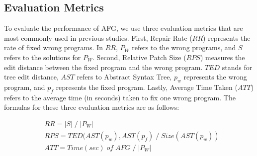 \documentclass[10pt,conference]{IEEEtran}
\begin{document}
    \subsection{Evaluation Metrics}
        To evaluate the performance of AFG, we use three evaluation metrics that are most commonly used in previous studies. First, Repair Rate ($RR$) represents the rate of fixed wrong programs. In $RR$, $P_{W}$ refers to the wrong programs, and $S$ refers to the solutions for $P_{W}$. Second, Relative Patch Size ($RPS$) measures the edit distance between the fixed program and the wrong program. $TED$ stands for tree edit distance, $AST$ refers to Abstract Syntax Tree, $p_{w}$ represents the wrong program, and $p_{f}$ represents the fixed program. Lastly, Average Time Taken ($ATT$) refers to the average time (in seconds) taken to fix one wrong program. The formulas for these three evaluation metrics are as follows:

        \begin{align}
            &RR = |S|\;/\;|P_{W}| \nonumber \\
            &RPS = TED(AST(p_{w}),AST(p_{f})\;/\;Size(AST(p_{w})) \nonumber \\
            &ATT = Time(sec)\;of\;AFG\;/\;|P_{W}| \nonumber
        \end{align}
\end{document}
